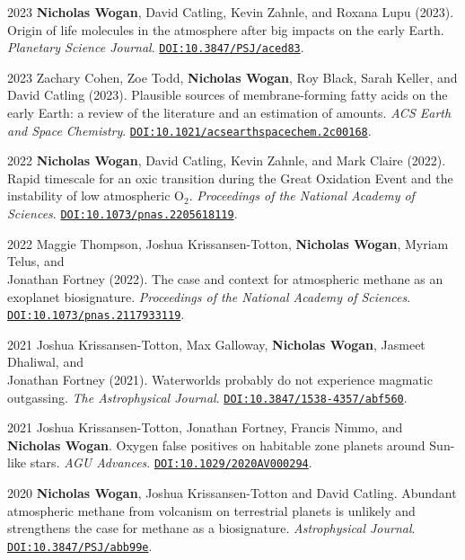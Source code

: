 \documentclass{article}
\begin{document}
\begin{cvlist}
\item[2023]
  \textbf{Nicholas Wogan}, David Catling, Kevin Zahnle, and Roxana Lupu (2023). Origin of life molecules in the atmosphere after big impacts on the early Earth. \emph{Planetary Science Journal}. \href{https://doi.org/10.3847/PSJ/aced83}{\nolinkurl{DOI:10.3847/PSJ/aced83}}.
\item[2023]
  Zachary Cohen, Zoe Todd, \textbf{Nicholas Wogan}, Roy Black, Sarah Keller, and David Catling (2023). Plausible sources of membrane-forming fatty acids on the early Earth: a review of the literature and an estimation of amounts. \emph{ACS Earth and Space Chemistry}. \href{https://doi.org/10.1021/acsearthspacechem.2c00168}{\nolinkurl{DOI:10.1021/acsearthspacechem.2c00168}}.
\item[2022]
  \textbf{Nicholas Wogan}, David Catling, Kevin Zahnle, and Mark Claire (2022). Rapid timescale for an oxic transition during the Great Oxidation Event and the instability of low atmospheric O$_2$. \emph{Proceedings of the National Academy of Sciences}. \href{https://doi.org/10.1073/pnas.2205618119}{\nolinkurl{DOI:10.1073/pnas.2205618119}}.
\item[2022]
  Maggie Thompson, Joshua Krissansen-Totton, \textbf{Nicholas Wogan}, Myriam Telus, and \\Jonathan Fortney (2022). The case and context for atmospheric methane as an exoplanet biosignature. \emph{Proceedings of the National Academy of Sciences}. \href{https://doi.org/10.1073/pnas.2117933119}{\nolinkurl{DOI:10.1073/pnas.2117933119}}.
\item[2021]
  Joshua Krissansen-Totton, Max Galloway, \textbf{Nicholas Wogan}, Jasmeet Dhaliwal, and \\Jonathan Fortney (2021). Waterworlds probably do not experience magmatic outgassing. \emph{The Astrophysical Journal}. \href{https://doi.org/10.3847/1538-4357/abf560}{\nolinkurl{DOI:10.3847/1538-4357/abf560}}.
\item[2021]
  Joshua Krissansen-Totton, Jonathan Fortney, Francis Nimmo, and \textbf{Nicholas Wogan}. Oxygen false positives on habitable zone planets around Sun-like stars. \emph{AGU Advances}. \href{https://doi.org/10.1029/2020AV000294}{\nolinkurl{DOI:10.1029/2020AV000294}}.
\item[2020]
  \textbf{Nicholas Wogan}, Joshua Krissansen-Totton and David Catling. Abundant atmospheric methane from volcanism on terrestrial planets is unlikely and strengthens the case for methane as a biosignature. \emph{Astrophysical Journal}. \href{https://doi.org/10.3847/PSJ/abb99e}{\nolinkurl{DOI:10.3847/PSJ/abb99e}}.

\end{cvlist}
\end{document}
